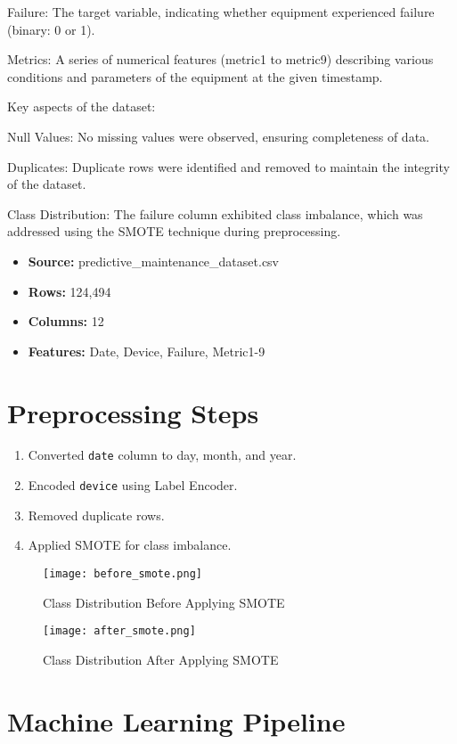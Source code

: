 \documentclass[a4paper,12pt]{article}
\begin{document}
	Failure: The target variable, indicating whether equipment experienced failure (binary: 0 or 1).
	
	Metrics: A series of numerical features (metric1 to metric9) describing various conditions and parameters of the equipment at the given timestamp.
	
	Key aspects of the dataset:
	
	Null Values: No missing values were observed, ensuring completeness of data.
	
	Duplicates: Duplicate rows were identified and removed to maintain the integrity of the dataset.
	
	Class Distribution: The failure column exhibited class imbalance, which was addressed using the SMOTE technique during preprocessing.
	\begin{itemize}
		\item \textbf{Source:} predictive\_maintenance\_dataset.csv
		\item \textbf{Rows:} 124,494
		\item \textbf{Columns:} 12
		\item \textbf{Features:} Date, Device, Failure, Metric1-9
	\end{itemize}
	
	\section{Preprocessing Steps}
	\begin{enumerate}
		\item Converted \texttt{date} column to day, month, and year.
		\item Encoded \texttt{device} using Label Encoder.
		\item Removed duplicate rows.
		\item Applied SMOTE for class imbalance.
	\end{enumerate}
	\begin{figure}[h!]
		\centering
		\texttt{[image: before\_smote.png]} %
		\caption{Class Distribution Before Applying SMOTE}
		\label{fig:before_smote}
	\end{figure}
	\begin{figure}[h!]
		\centering
		\texttt{[image: after\_smote.png]} %
		\caption{Class Distribution After Applying SMOTE}
		\label{fig:after_smote}
	\end{figure}
	
	\section{Machine Learning Pipeline}
\end{document}
